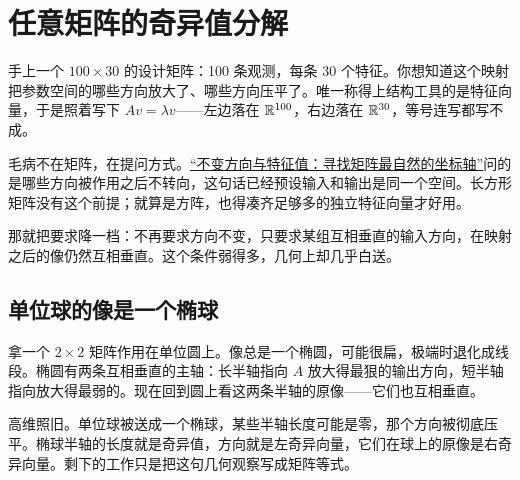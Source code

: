 \section{任意矩阵的奇异值分解}
\label{sec:03-Linear-Algebra/07-SVD-and-Data-Applications/01}

手上一个 \(100\times 30\) 的设计矩阵：100 条观测，每条 30 个特征。你想知道这个映射把参数空间的哪些方向放大了、哪些方向压平了。唯一称得上结构工具的是特征向量，于是照着写下 \(Av=\lambda v\)——左边落在 \(\mathbb{R}^{100}\)，右边落在 \(\mathbb{R}^{30}\)，等号连写都写不成。

毛病不在矩阵，在提问方式。\hyperref[sec:03-Linear-Algebra/05-Eigenvalues-and-Eigenvectors/01]{``不变方向与特征值：寻找矩阵最自然的坐标轴''}问的是哪些方向被作用之后不转向，这句话已经预设输入和输出是同一个空间。长方形矩阵没有这个前提；就算是方阵，也得凑齐足够多的独立特征向量才好用。

那就把要求降一档：不再要求方向不变，只要求某组互相垂直的输入方向，在映射之后的像仍然互相垂直。这个条件弱得多，几何上却几乎白送。

\subsection{单位球的像是一个椭球}

拿一个 \(2\times2\) 矩阵作用在单位圆上。像总是一个椭圆，可能很扁，极端时退化成线段。椭圆有两条互相垂直的主轴：长半轴指向 \(A\) 放大得最狠的输出方向，短半轴指向放大得最弱的。现在回到圆上看这两条半轴的原像——它们也互相垂直。

高维照旧。单位球被送成一个椭球，某些半轴长度可能是零，那个方向被彻底压平。椭球半轴的长度就是奇异值，方向就是左奇异向量，它们在球上的原像是右奇异向量。剩下的工作只是把这句几何观察写成矩阵等式。

